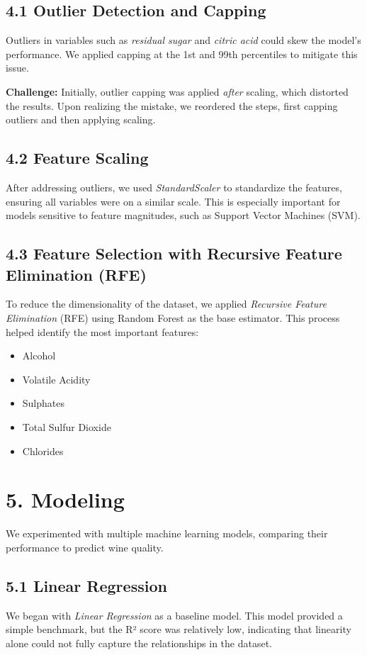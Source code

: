 \documentclass{article}
\begin{document}
\subsection{4.1 Outlier Detection and Capping}
Outliers in variables such as \textit{residual sugar} and \textit{citric acid} could skew the model's performance. We applied capping at the 1st and 99th percentiles to mitigate this issue.

\textbf{Challenge:} Initially, outlier capping was applied \textit{after} scaling, which distorted the results. Upon realizing the mistake, we reordered the steps, first capping outliers and then applying scaling.

\subsection{4.2 Feature Scaling}
After addressing outliers, we used \textit{StandardScaler} to standardize the features, ensuring all variables were on a similar scale. This is especially important for models sensitive to feature magnitudes, such as Support Vector Machines (SVM).

\subsection{4.3 Feature Selection with Recursive Feature Elimination (RFE)}
To reduce the dimensionality of the dataset, we applied \textit{Recursive Feature Elimination} (RFE) using Random Forest as the base estimator. This process helped identify the most important features:
\begin{itemize}
    \item Alcohol
    \item Volatile Acidity
    \item Sulphates
    \item Total Sulfur Dioxide
    \item Chlorides
\end{itemize}

\section{5. Modeling}
We experimented with multiple machine learning models, comparing their performance to predict wine quality.

\subsection{5.1 Linear Regression}
We began with \textit{Linear Regression} as a baseline model. This model provided a simple benchmark, but the R² score was relatively low, indicating that linearity alone could not fully capture the relationships in the dataset.
\end{document}
